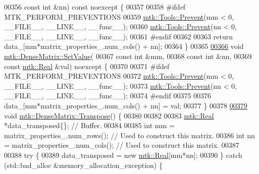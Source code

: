 \begin{DoxyCode}
00356     \textcolor{keyword}{const} \textcolor{keywordtype}{int} &nn) \textcolor{keyword}{const} noexcept \{
00357 
00358 \textcolor{preprocessor}{  #ifdef MTK\_PERFORM\_PREVENTIONS}
00359   \hyperlink{classmtk_1_1Tools_a332324c6f25e66be9dff48c5987a3b9f}{mtk::Tools::Prevent}(mm < 0, \_\_FILE\_\_, \_\_LINE\_\_, \_\_func\_\_);
00360   \hyperlink{classmtk_1_1Tools_a332324c6f25e66be9dff48c5987a3b9f}{mtk::Tools::Prevent}(nn < 0, \_\_FILE\_\_, \_\_LINE\_\_, \_\_func\_\_);
00361 \textcolor{preprocessor}{  #endif}
00362 
00363   \textcolor{keywordflow}{return} data\_[mm*matrix\_properties\_.num\_cols() + nn];
00364 \}
00365 
\hypertarget{mtk__dense__matrix_8cc_source_l00366}{}\hyperlink{classmtk_1_1DenseMatrix_a784ce5784109ac86bfb9d8562b334b13}{00366} \textcolor{keywordtype}{void}  \hyperlink{classmtk_1_1DenseMatrix_a784ce5784109ac86bfb9d8562b334b13}{mtk::DenseMatrix::SetValue}(
00367     \textcolor{keyword}{const} \textcolor{keywordtype}{int} &mm,
00368     \textcolor{keyword}{const} \textcolor{keywordtype}{int} &nn,
00369     \textcolor{keyword}{const} \hyperlink{group__c01-roots_gac080bbbf5cbb5502c9f00405f894857d}{mtk::Real} &val) noexcept \{
00370 
00371 \textcolor{preprocessor}{  #ifdef MTK\_PERFORM\_PREVENTIONS}
00372   \hyperlink{classmtk_1_1Tools_a332324c6f25e66be9dff48c5987a3b9f}{mtk::Tools::Prevent}(mm < 0, \_\_FILE\_\_, \_\_LINE\_\_, \_\_func\_\_);
00373   \hyperlink{classmtk_1_1Tools_a332324c6f25e66be9dff48c5987a3b9f}{mtk::Tools::Prevent}(nn < 0, \_\_FILE\_\_, \_\_LINE\_\_, \_\_func\_\_);
00374 \textcolor{preprocessor}{  #endif}
00375 
00376   data\_[mm*matrix\_properties\_.num\_cols() + nn] = val;
00377 \}
00378 
\hypertarget{mtk__dense__matrix_8cc_source_l00379}{}\hyperlink{classmtk_1_1DenseMatrix_a71d9c07ca66e88d97d1fd5012f43138b}{00379} \textcolor{keywordtype}{void} \hyperlink{classmtk_1_1DenseMatrix_a71d9c07ca66e88d97d1fd5012f43138b}{mtk::DenseMatrix::Transpose}() \{
00380 
00382 
00383   \hyperlink{group__c01-roots_gac080bbbf5cbb5502c9f00405f894857d}{mtk::Real} *data\_transposed\{\}; \textcolor{comment}{// Buffer.}
00384 
00385   \textcolor{keywordtype}{int} mm = matrix\_properties\_.num\_rows(); \textcolor{comment}{// Used to construct this matrix.}
00386   \textcolor{keywordtype}{int} nn = matrix\_properties\_.num\_cols(); \textcolor{comment}{// Used to construct this matrix.}
00387 
00388   \textcolor{keywordflow}{try} \{
00389     data\_transposed = \textcolor{keyword}{new} \hyperlink{group__c01-roots_gac080bbbf5cbb5502c9f00405f894857d}{mtk::Real}[mm*nn];
00390   \} \textcolor{keywordflow}{catch} (std::bad\_alloc &memory\_allocation\_exception) \{

\end{DoxyCode}
